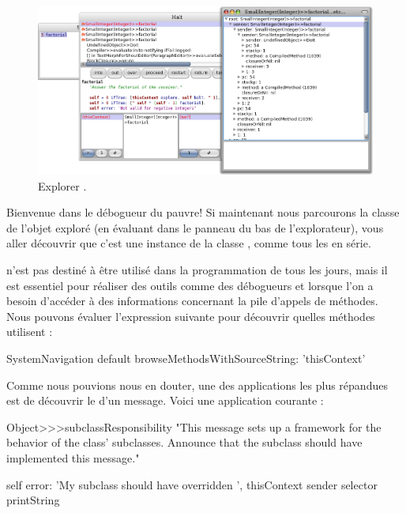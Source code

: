 \documentclass[a4paper,10pt,twoside]{book}
\begin{document}
\begin{figure}[ht]\centering
	\includegraphics[width=\linewidth]{exploringThisContext}
	\caption{Explorer .}
\end{figure}

Bienvenue dans le débogueur du pauvre! 
Si maintenant nous parcourons la classe de l'objet exploré (\ie en évaluant  dans le panneau du bas de l'explorateur), vous aller découvrir que c'est une instance de la classe , comme tous les \senders en série.

 n'est pas destiné à être utilisé dans la programmation de tous les jours, mais il est essentiel pour réaliser des outils comme des débogueurs et lorsque l'on a besoin d'accéder à des informations concernant la pile d'appels de méthodes.
Nous pouvons évaluer l'expression suivante pour découvrir quelles méthodes utilisent :

\begin{code}{}
SystemNavigation default browseMethodsWithSourceString: 'thisContext'
\end{code}

Comme nous pouvions nous en douter, une des applications les plus répandues est de découvrir le \sender d'un message.
Voici une application courante :
\begin{code}{}
Object>>>subclassResponsibility
	"This message sets up a framework for the behavior of the class' subclasses.
	Announce that the subclass should have implemented this message."

	self error: 'My subclass should have overridden ', thisContext sender selector printString
\end{code}
\end{document}
